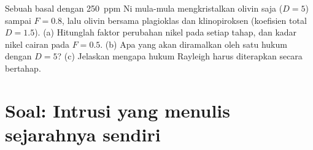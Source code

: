 \begin{exercise}[$\star\star\star$]\label{exo:b2:magmatic-differentiation:12}
Sebuah basal dengan \qty{250}{ppm} Ni mula-mula mengkristalkan olivin saja ($D = 5$) sampai
$F = 0.8$, lalu olivin bersama plagioklas dan klinopiroksen (koefisien total $D = 1.5$). (a)
Hitunglah faktor perubahan nikel pada setiap tahap, dan kadar nikel
cairan pada $F = 0.5$. (b) Apa yang akan diramalkan oleh satu hukum dengan $D = 5$?
(c) Jelaskan mengapa hukum Rayleigh harus diterapkan secara bertahap.
\end{exercise}

\section{Soal: Intrusi yang menulis sejarahnya sendiri}

